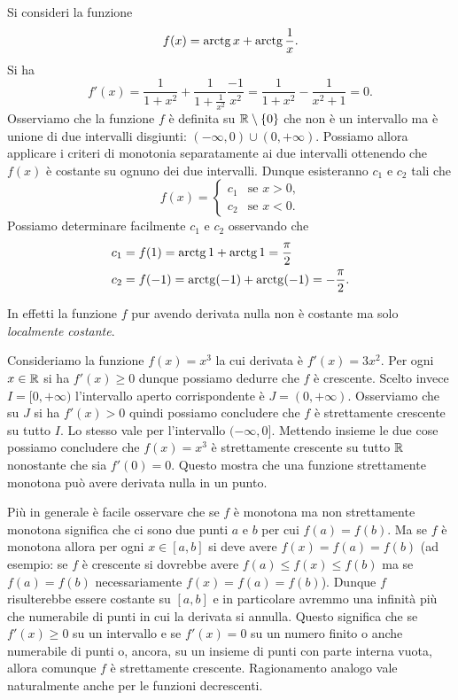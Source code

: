 \begin{example}
Si consideri la funzione
\[
  f(x) = \operatorname{arctg} x + \operatorname{arctg}\frac 1 x.
\]
Si ha
\[
  f'(x) = \frac{1}{1+ x^2} + \frac{1}{1 + \frac {1}{x^2}} \frac{-1}{x^2}
    = \frac {1}{1+x^2} - \frac{1}{x^2 + 1} = 0.
\]
Osserviamo che la funzione $f$ è definita su $\mathbb R\setminus {\left\{ 0 \right\}}$ che non è un intervallo ma è unione di due intervalli disgiunti: $(-\infty, 0) \cup (0, +\infty)$. Possiamo allora applicare i criteri di monotonia separatamente ai due intervalli ottenendo che $f(x)$ è costante su ognuno dei due intervalli. Dunque esisteranno $c_1$ e $c_2$ tali che
\[
  f(x) = \begin{cases} c_1 & \text{se $x>0$,} \\
  c_2 & \text{se $x<0$.}
  \end{cases}
\]
Possiamo determinare facilmente $c_1$ e $c_2$ osservando che
\begin{align*}
c_1 &= f(1) = \operatorname{arctg} 1 + \operatorname{arctg} 1 = \frac{\pi}{2} \\
c_2 &= f(-1) = \operatorname{arctg} (-1) + \operatorname{arctg} (-1) = - \frac{\pi}{2}.
\end{align*}
\end{example}
In effetti la funzione $f$ pur avendo derivata nulla non è costante ma solo \emph{localmente costante}.

\begin{example}
Consideriamo la funzione $f(x) = x^3$ la cui derivata è $f'(x) = 3x^2$.
Per ogni $x\in \mathbb R$ si ha $f'(x)\ge 0$ dunque possiamo dedurre che $f$ è crescente.
Scelto invece $I = [0,+\infty)$ l'intervallo aperto corrispondente è $J=(0,+\infty)$. Osserviamo che su $J$ si ha $f'(x) > 0$ quindi possiamo concludere che $f$ è strettamente crescente su tutto $I$. Lo stesso vale per l'intervallo $(-\infty,0]$. Mettendo insieme le due cose possiamo concludere che $f(x) = x^3$ è strettamente crescente su tutto $\mathbb R$ nonostante che sia $f'(0)=0$. Questo mostra che una funzione strettamente monotona può avere derivata nulla in un punto.
\end{example}

Più in generale è facile osservare che se $f$ è monotona ma non strettamente
monotona significa che ci sono due punti $a$ e $b$ per cui $f(a) = f(b)$.
Ma se $f$ è monotona allora per ogni $x\in [a,b]$ si deve avere
$f(x) = f(a) = f(b)$ (ad esempio: se $f$ è crescente si dovrebbe avere
$f(a) \le f(x) \le f(b)$ ma se $f(a)=f(b)$ necessariamente $f(x)=f(a)=f(b)$).
Dunque $f$ risulterebbe essere costante su $[a,b]$ e in particolare avremmo
una infinità più che numerabile di punti in cui la derivata si annulla.
Questo significa che se $f'(x)\ge 0$ su un intervallo e se $f'(x)=0$ su un
numero finito o anche numerabile di punti o, ancora, su un insieme di punti
con parte interna vuota, allora comunque $f$ è strettamente
crescente.
Ragionamento analogo vale naturalmente anche per le funzioni decrescenti.

